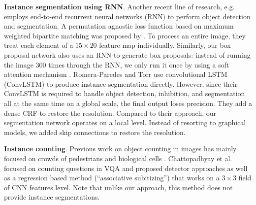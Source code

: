 \textbf{Instance segmentation using RNN}. Another recent line of research, e.g.
\cite{stewart15lstmdet, park15ris, romeraparedes15ris} employs end-to-end
recurrent neural networks (RNN) to perform object detection and segmentation. A
permutation agnostic loss function based on maximum weighted bipartite matching
was proposed by \cite{stewart15lstmdet}. To process an entire image, they treat
each element of a $15\times20$ feature map individually. Similarly, our box
proposal network also uses an RNN to generate box proposals: instead of running
the image 300 times through the RNN, we only run it once by using a soft
attention mechanism \cite{xu15caption}. Romera-Paredes and Torr
\cite{romeraparedes15ris} use convolutional LSTM (ConvLSTM)
\cite{shi2015convlstm} to produce instance segmentation directly. However,
since their ConvLSTM is required to handle object detection, inhibition, and
segmentation all at the same time on a global scale, the final output loses
precision. They add a dense CRF to restore the resolution. Compared to their
approach, our segmentation network operates on a local level. Instead of
resorting to graphical models, we added skip connections to restore the
resolution.

\textbf{Instance counting}. Previous work on object counting in images has
mainly focused on crowds of pedestrians and biological cells
\cite{lempitsky10count}. Chattopadhyay et al. \cite{chattopadhyay16count}
focused on counting questions in VQA and proposed detector approaches as well
as a regression based method (``associative subitizing'') that works on a $3
\times 3$ field of CNN features level. Note that unlike our approach, this
method does not provide instance segmentations.
